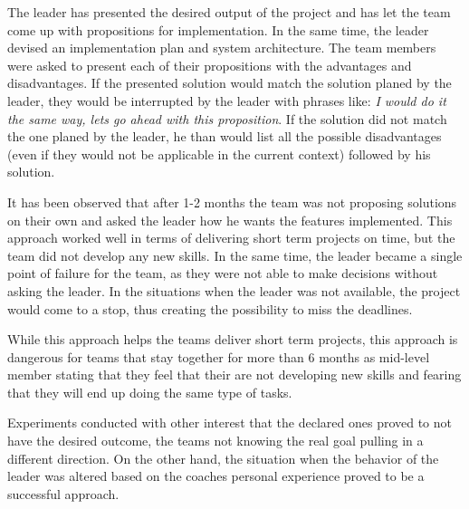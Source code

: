 The leader has presented the desired output of the project and has let the team come up with propositions for implementation. In the same time, the leader devised an implementation plan and system architecture.  The team members were asked to present each of their propositions with the advantages and disadvantages. If the presented solution would match the solution planed by the leader, they would be interrupted by the leader with phrases like: \textit{I would do it the same way, lets go ahead with this proposition}. If the solution did not match the one planed by the leader, he than would list all the possible disadvantages (even if they would not be applicable in the current context) followed by his solution.

It has been observed that after 1-2 months the team was not proposing solutions on their own and asked the leader how he wants the features implemented. This approach worked well in terms of delivering short term projects on time, but the team did not develop any new skills. In the same time, the leader became a single point of failure for the team, as they were not able to make decisions without asking the leader. In the situations when the leader was not available, the project would come to a stop, thus creating the possibility to miss the deadlines.

While this approach helps the teams deliver short term projects, this approach is dangerous for teams that stay together for more than 6 months as mid-level member stating that they feel that their are not developing new skills and fearing that they will end up doing the same type of tasks. 

Experiments conducted with other interest that the declared ones proved to not have the desired outcome, the teams not knowing the real goal pulling in a different direction. On the other hand, the situation when the behavior of the leader was altered based on the coaches personal experience proved to be a successful approach.